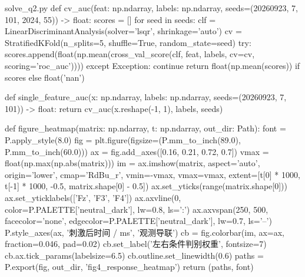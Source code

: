 \documentclass[bwprint]{gmcmthesis}
\begin{document}
\begin{appendices}
\begin{Python}{solve\_q2.py}
def cv_auc(feat: np.ndarray, labels: np.ndarray, seeds=(20260923, 7, 101, 2024, 55)) -> float:
    scores = []
    for seed in seeds:
        clf = LinearDiscriminantAnalysis(solver='lsqr', shrinkage='auto')
        cv = StratifiedKFold(n_splits=5, shuffle=True, random_state=seed)
        try:
            scores.append(float(np.mean(cross_val_score(clf, feat, labels, cv=cv, scoring='roc_auc'))))
        except Exception:
            continue
    return float(np.mean(scores)) if scores else float('nan')

def single_feature_auc(x: np.ndarray, labels: np.ndarray, seeds=(20260923, 7, 101)) -> float:
    return cv_auc(x.reshape(-1, 1), labels, seeds)

def figure_heatmap(matrix: np.ndarray, t: np.ndarray, out_dir: Path):
    font = P.apply_style(8.0)
    fig = plt.figure(figsize=(P.mm_to_inch(89.0), P.mm_to_inch(60.0)))
    ax = fig.add_axes([0.16, 0.21, 0.72, 0.7])
    vmax = float(np.max(np.abs(matrix)))
    im = ax.imshow(matrix, aspect='auto', origin='lower', cmap='RdBu_r', vmin=-vmax, vmax=vmax, extent=[t[0] * 1000, t[-1] * 1000, -0.5, matrix.shape[0] - 0.5])
    ax.set_yticks(range(matrix.shape[0]))
    ax.set_yticklabels(['Fz', 'F3', 'F4'])
    ax.axvline(0, color=P.PALETTE['neutral_dark'], lw=0.8, ls=':')
    ax.axvspan(250, 500, facecolor='none', edgecolor=P.PALETTE['neutral_dark'], lw=0.7, ls='--')
    P.style_axes(ax, '刺激后时间 / ms', '观测导联')
    cb = fig.colorbar(im, ax=ax, fraction=0.046, pad=0.02)
    cb.set_label('左右条件判别权重', fontsize=7)
    cb.ax.tick_params(labelsize=6.5)
    cb.outline.set_linewidth(0.6)
    paths = P.export(fig, out_dir, 'fig4_response_heatmap')
    return (paths, font)


\end{Python}
\end{appendices}
\end{document}
